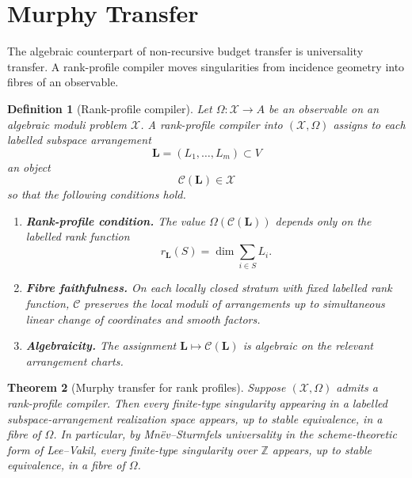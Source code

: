 \documentclass[11pt]{article}
\newtheorem{theorem}{Theorem}[section]
\newtheorem{definition}[theorem]{Definition}
\begin{document}
\section{Murphy Transfer}

The algebraic counterpart of non-recursive budget transfer is universality transfer. A rank-profile compiler moves singularities from incidence geometry into fibres of an observable.

\begin{definition}[Rank-profile compiler]
Let \(\Omega:\mathcal X\to A\) be an observable on an algebraic moduli problem \(\mathcal X\). A rank-profile compiler into \((\mathcal X,\Omega)\) assigns to each labelled subspace arrangement
\[
\mathbf L=(L_1,\ldots,L_m)\subset V
\]
an object
\[
\mathcal C(\mathbf L)\in\mathcal X
\]
so that the following conditions hold.

\begin{enumerate}[label=(\roman*)]
\item \textbf{Rank-profile condition.} The value \(\Omega(\mathcal C(\mathbf L))\) depends only on the labelled rank function
\[
r_{\mathbf L}(S)=\dim\sum_{i\in S}L_i.
\]
\item \textbf{Fibre faithfulness.} On each locally closed stratum with fixed labelled rank function, \(\mathcal C\) preserves the local moduli of arrangements up to simultaneous linear change of coordinates and smooth factors.
\item \textbf{Algebraicity.} The assignment \(\mathbf L\mapsto\mathcal C(\mathbf L)\) is algebraic on the relevant arrangement charts.
\end{enumerate}
\end{definition}

\begin{theorem}[Murphy transfer for rank profiles]
Suppose \((\mathcal X,\Omega)\) admits a rank-profile compiler. Then every finite-type singularity appearing in a labelled subspace-arrangement realization space appears, up to stable equivalence, in a fibre of \(\Omega\). In particular, by Mnëv--Sturmfels universality in the scheme-theoretic form of Lee--Vakil, every finite-type singularity over \(\mathbb Z\) appears, up to stable equivalence, in a fibre of \(\Omega\).
\end{theorem}
\end{document}
